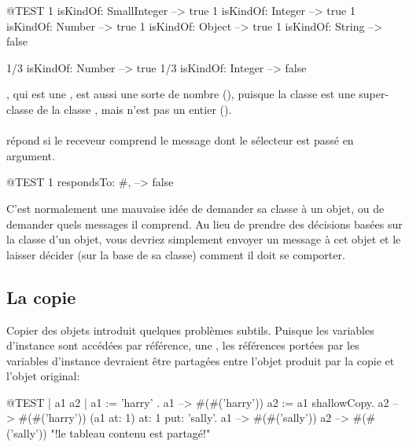 \documentclass[a4paper,10pt,twoside]{book}
\begin{document}
\begin{code}{@TEST}
1 isKindOf: SmallInteger --> true
1 isKindOf: Integer          --> true
1 isKindOf: Number         --> true
1 isKindOf: Object           --> true
1 isKindOf: String            --> false

1/3 isKindOf: Number      --> true
1/3 isKindOf: Integer        --> false
\end{code}

, qui est une , est aussi une sorte de nombre (), puisque la classe  est une super-classe de la classe , mais  n'est pas un entier ().

\paragraph{}
 répond  si le receveur comprend le message dont le sélecteur est passé en argument.

\begin{code}{@TEST}
1 respondsTo: #, --> false
\end{code}

C'est normalement une mauvaise idée de demander sa classe à un objet, ou de demander quels messages il comprend.
Au lieu de prendre des décisions basées sur la classe d'un objet, vous devriez simplement envoyer un message à cet objet et le laisser décider (\ie sur la base de sa classe) comment il doit se comporter.

\subsection{La copie}

Copier des objets introduit quelques problèmes subtils. Puisque les variables d'instance sont accédées par référence, une , les références portées par les variables d'instance devraient être partagées entre l'objet produit par la copie et l'objet original:

\begin{code}{@TEST | a1 a2 |}
a1 := { { 'harry' } }.
a1 --> #(#('harry'))
a2 := a1 shallowCopy.
a2 --> #(#('harry'))
(a1 at: 1) at: 1 put: 'sally'.
a1 --> #(#('sally'))
a2 --> #(#('sally'))    "!le tableau contenu est partagé!"
\end{code}
\end{document}
